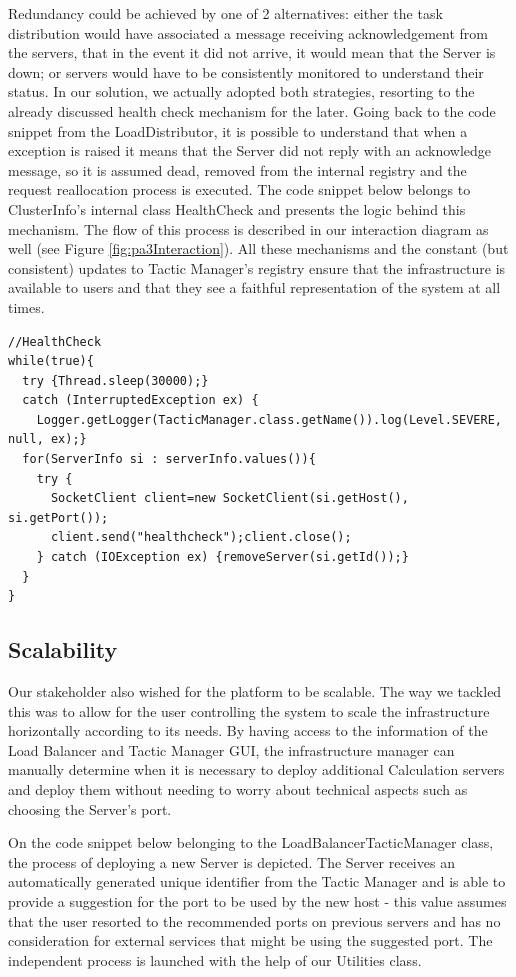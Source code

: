 \documentclass[12pt]{article}
\begin{document}
Redundancy could be achieved by one of 2 alternatives:
either the task distribution would have associated a message receiving acknowledgement from the servers, that in the event it did not arrive, it would mean that
the Server is down;
or servers would have to be consistently monitored to understand their status.
In our solution, we actually adopted both strategies, resorting to the already discussed health check mechanism for the later.
Going back to the code snippet from the LoadDistributor, it is possible to understand that when a exception is raised it means that the Server did not reply
with an acknowledge message, so it is assumed dead, removed from the internal registry and the request reallocation process is executed.
The code snippet below belongs to ClusterInfo's internal class HealthCheck and presents the logic behind this mechanism.
The flow of this process is described in our interaction diagram as well (see Figure \ref{fig:pa3Interaction}).
All these mechanisms and the constant (but consistent) updates to Tactic Manager's registry ensure that the infrastructure is available to users and that they
see a faithful representation of the system at all times.

\begin{lstlisting}
//HealthCheck
while(true){
  try {Thread.sleep(30000);}
  catch (InterruptedException ex) {
    Logger.getLogger(TacticManager.class.getName()).log(Level.SEVERE, null, ex);}
  for(ServerInfo si : serverInfo.values()){
    try {
      SocketClient client=new SocketClient(si.getHost(), si.getPort());
      client.send("healthcheck");client.close();
    } catch (IOException ex) {removeServer(si.getId());}
  }
}
\end{lstlisting}

\subsection{Scalability} \label{scalability}

Our stakeholder also wished for the platform to be scalable.
The way we tackled this was to allow for the user controlling the system to scale the infrastructure horizontally according to its needs.
By having access to the information of the Load Balancer and Tactic Manager GUI, the infrastructure manager can manually determine when it is necessary to deploy
additional Calculation servers and deploy them without needing to worry about technical aspects such as choosing the Server's port.

On the code snippet below belonging to the LoadBalancerTacticManager class, the process of deploying a new Server is depicted.
The Server receives an automatically generated unique identifier from the Tactic Manager and is able to provide a suggestion for the port to be used by the new
host - this value assumes that the user resorted to the recommended ports on previous servers and has no consideration for external services that might be using
the suggested port.
The independent process is launched with the help of our Utilities class.
\end{document}
